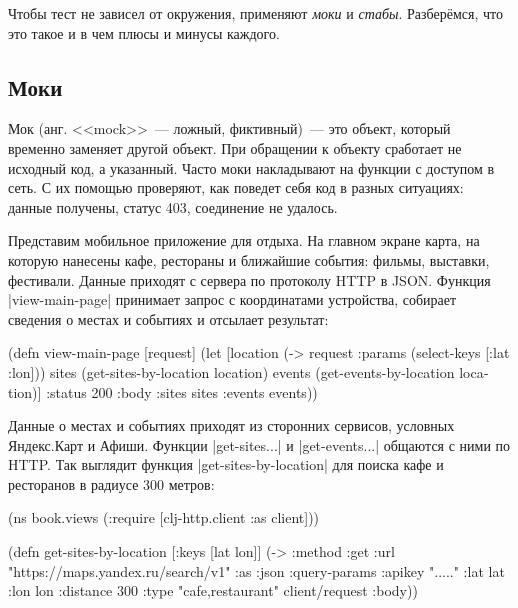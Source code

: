 Чтобы тест не зависел от окружения, применяют \emph{моки} и
\emph{стабы}. Разбер\"{е}мся, что это такое и в чем плюсы и минусы каждого.

\subsection{Моки}


Мок (анг. <<mock>>~--- ложный, фиктивный)~--- это объект, который временно
заменяет другой объект. При обращении к объекту сработает не исходный код, а
указанный. Часто моки накладывают на функции с доступом в сеть. С их помощью
проверяют, как поведет себя код в разных ситуациях: данные получены, статус 403,
соединение не удалось.

\label{mobile-app-intro}


Представим мобильное приложение для отдыха. На главном экране карта, на которую
нанесены кафе, рестораны и ближайшие события: фильмы, выставки,
фестивали. Данные приходят с сервера по протоколу HTTP в JSON. Функция
\spverb|view-main-page| принимает запрос с координатами устройства, собирает
сведения о местах и событиях и отсылает результат:

\begin{english}
  \begin{clojure}
(defn view-main-page [request]
  (let [location (-> request :params (select-keys [:lat :lon]))
        sites (get-sites-by-location location)
        events (get-events-by-location location)]
    {:status 200
     :body {:sites sites :events events}}))
  \end{clojure}
\end{english}

Данные о местах и событиях приходят из сторонних сервисов, условных Яндекс.Карт
и Афиши. Функции \spverb|get-sites...| и \spverb|get-events...| общаются с ними
по HTTP. Так выглядит функция \spverb|get-sites-by-location| для поиска кафе и
ресторанов в радиусе 300 метров:


\begin{english}
  \begin{clojure}
(ns book.views
  (:require [clj-http.client :as client]))

(defn get-sites-by-location
  [{:keys [lat lon]}]
  (-> {:method :get
       :url "https://maps.yandex.ru/search/v1"
       :as :json
       :query-params {:apikey "....."
                      :lat lat :lon lon :distance 300
                      :type "cafe,restaurant"}}
      client/request
      :body))
  \end{clojure}
\end{english}

